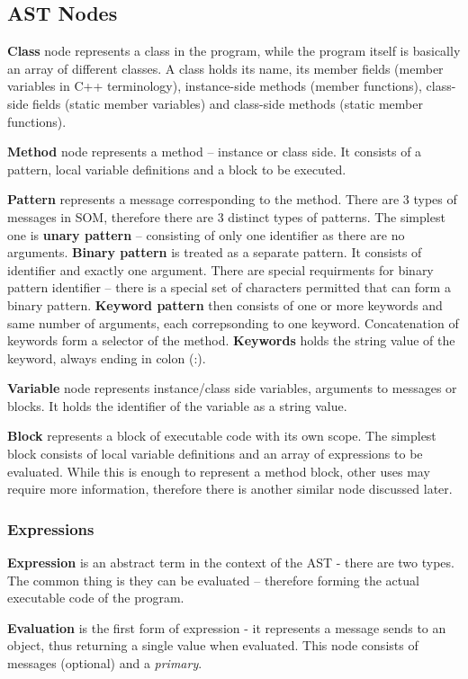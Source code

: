 \documentclass[thesis=M,english]{FITthesis}[2019/12/23]
\begin{document}
\subsection{AST Nodes}
\textbf{Class} node represents a class in the program, while the program itself is basically an array of different classes. A class
holds its name, its member fields (member variables in C++ terminology), instance-side methods (member functions), class-side fields
(static member variables) and class-side methods (static member functions).

\textbf{Method} node represents a method -- instance or class side. It consists of a pattern, local variable definitions and a block
to be executed.

\textbf{Pattern} represents a message corresponding to the method. There are 3 types of messages in SOM, therefore there are 3 distinct
types of patterns. The simplest one is \textbf{unary pattern} -- consisting of only one identifier as there are no arguments. \textbf{Binary pattern}
is treated as a separate pattern. It consists of identifier and exactly one argument. There are special requirments for binary pattern identifier
-- there is a special set of characters permitted that can form a binary pattern. \textbf{Keyword pattern} then consists of one or more keywords and
same number of arguments, each correpsonding to one keyword. Concatenation of keywords form a selector of the method. \textbf{Keywords} holds the string
value of the keyword, always ending in colon (:).

\textbf{Variable} node represents instance/class side variables, arguments to messages or blocks. It holds the identifier of the variable as a string value.

\textbf{Block} represents a block of executable code with its own scope. The simplest block consists of local variable definitions and an array of
expressions to be evaluated. While this is enough to represent a method block, other uses may require more information, therefore there is another
similar node discussed later.

\subsubsection{Expressions}
\textbf{Expression} is an abstract term in the context of the AST - there are two types. The common thing is they can be evaluated -- therefore forming
the actual executable code of the program. 

\textbf{Evaluation} is the first form of expression - it represents a message sends to an object, thus returning a single value when evaluated. This node
consists of messages (optional) and a \textit{primary}.
\end{document}
